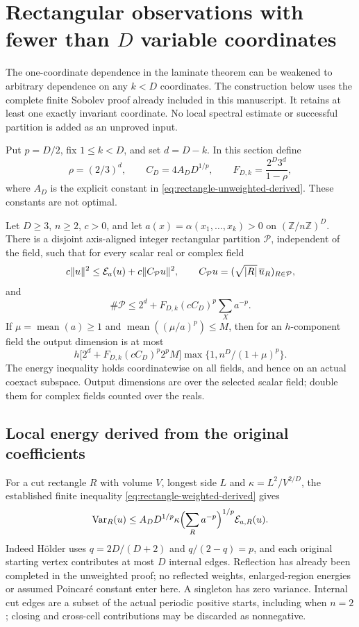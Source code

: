 \clearpage
\section{Rectangular observations with fewer than $D$ variable coordinates}
\label{sec:partial188}
The one-coordinate dependence in the laminate theorem can be weakened to
arbitrary dependence on any $k<D$ coordinates. The construction below uses
the complete finite Sobolev proof already included in this manuscript.
It retains at least one exactly invariant coordinate. No local spectral
estimate or successful partition is added as an unproved input.

Put $p=D/2$, fix $1\le k<D$, and set $d=D-k$. In this section define
\[
 \rho=(2/3)^d,\qquad C_D=4A_DD^{1/p},\qquad
 F_{D,k}=\frac{2^D3^d}{1-\rho},
\]
where $A_D$ is the explicit constant in
\eqref{eq:rectangle-unweighted-derived}. These constants are not optimal.
\begin{theorem}\label{thm:partial188}
Let $D\ge3$, $n\ge2$, $c>0$, and let
$a(x)=\alpha(x_1,\ldots,x_k)>0$ on $(\mathbb Z/n\mathbb Z)^D$.
There is a disjoint axis-aligned integer rectangular partition $\mathcal P$,
independent of the field, such that for every scalar real or complex field
\[
 c\|u\|^2\le\mathcal E_a(u)+c\|C_{\mathcal P}u\|^2,\qquad
 C_{\mathcal P}u=(\sqrt{|R|}\,\overline u_R)_{R\in\mathcal P},
\]
and
\begin{equation}\label{eq:partial-count188}
 \#\mathcal P\le2^d+F_{D,k}(cC_D)^p\sum_Xa^{-p}.
\end{equation}
If $\mu=\operatorname{mean}(a)\ge1$ and
$\operatorname{mean}((\mu/a)^p)\le M$, then for an $h$-component field the
output dimension is at most
\[
 h\bigl[2^d+F_{D,k}(cC_D)^p2^pM\bigr]
 \max\{1,n^D/(1+\mu)^p\}.
\]
The energy inequality holds coordinatewise on all fields, and hence on an
actual coexact subspace. Output dimensions are over the selected scalar
field; double them for complex fields counted over the reals.
\end{theorem}

\subsection{Local energy derived from the original coefficients}
For a cut rectangle $R$ with volume $V$, longest side $L$ and
$\kappa=L^2/V^{2/D}$, the established finite inequality
\eqref{eq:rectangle-weighted-derived} gives
\begin{equation}\label{eq:partial-local188}
 \operatorname{Var}_R(u)\le A_D D^{1/p}\kappa
      \Bigl(\sum_Ra^{-p}\Bigr)^{1/p}\mathcal E_{a,R}(u).
\end{equation}
Indeed H\"older uses $q=2D/(D+2)$ and $q/(2-q)=p$, and each original
starting vertex contributes at most $D$ internal edges. Reflection has
already been completed in the unweighted proof; no reflected weights,
enlarged-region energies or assumed Poincar\'e constant enter here.
A singleton has zero variance. Internal cut edges are a subset of the
actual periodic positive starts, including when $n=2$; closing and
cross-cell contributions may be discarded as nonnegative.

